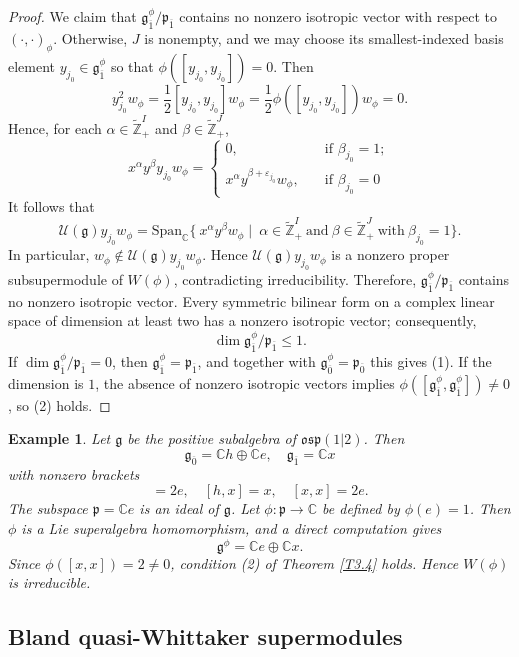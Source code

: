 \documentclass[12pt,reqno]{article}
\newtheorem{ex}{Example}[section]
\def\o{\overline}
\def\a{\alpha}
\def\b{\beta}
\def\F{\mathfrak}
\def\r{\mathrm}
\def\C{\mathcal}
\def\CC{\mathbb{C}}
\def\ZZ{\mathbb{Z}}
\def\beqn{\begin{equation*}}
\def\eeqn{\end{equation*}}
\def\({\left(}
\def\){\right)}
\begin{document}
\begin{proof}
 
We claim that $\F{g}^{\phi}_{\o{1}}/\F{p}_{\o{1}}$ contains no nonzero isotropic vector with respect to $(\cdot,\cdot)_{\phi}$. Otherwise, $J$ is nonempty, and we may choose its smallest-indexed basis element $y_{j_0}\in\F{g}^\phi_{\o{1}}$ so that $\phi([y_{j_0},y_{j_0}])=0$. Then
\beqn
y_{j_0}^2w_{\phi}=\frac{1}{2}[y_{j_0},y_{j_0}]w_\phi=\frac{1}{2}\phi\([y_{j_0},y_{j_0}]\)w_\phi=0.
\eeqn 
Hence, for each $\a\in\widetilde{\ZZ}_+^I$ and $\b\in\widetilde{\ZZ}_+^J$,
 \beqn
 x^\a y^\b y_{j_0}w_{\phi}=\begin{cases}
0,\quad & \text{if $\b_{j_0}=1$};\\
 x^\a y^{\b+\varepsilon_{j_0}} w_{\phi},\quad& \text{if $\b_{j_0}=0$}
\end{cases}
 \eeqn 
  It follows that 
\beqn
\C{U}(\F{g})y_{j_0}w_{\phi}=\r{Span}_\CC\{~x^\a y^\b w_{\phi}\mid~\a\in \widetilde{\ZZ}_+^I~\text{and}~\b\in \widetilde{\ZZ}_+^J~\text{with}~\b_{j_0}= 1\}.
\eeqn
In particular, $w_{\phi}\notin\C{U}(\F{g})y_{j_0}w_{\phi}$. Hence $\C{U}(\F{g})y_{j_0}w_{\phi}$ is a nonzero proper subsupermodule of $W(\phi)$, contradicting irreducibility. Therefore, $\F{g}^{\phi}_{\o{1}}/\F{p}_{\o{1}}$ contains no nonzero isotropic vector. Every symmetric bilinear form on a complex linear space of dimension at least two has a nonzero isotropic vector; consequently,
\beqn
\dim \F{g}^{\phi}_{\o{1}}/\F{p}_{\o{1}}\le 1.
\eeqn
If $\dim\F{g}^{\phi}_{\o{1}}/\F{p}_{\o{1}}=0$, then $\F{g}_{\o{1}}^\phi=\F{p}_{\o{1}}$, and together with $\F{g}_{\o{0}}^\phi=\F{p}_{\o{0}}$ this gives (1). If the dimension is $1$, the absence of nonzero isotropic vectors implies $\phi([\F{g}_{\o{1}}^\phi,\F{g}_{\o{1}}^\phi])\neq0$, so (2) holds.
 \end{proof}
 
\begin{ex}
Let $\F{g}$ be the positive subalgebra of $\F{osp}(1|2)$. Then 
\beqn
\F{g}_{\o{0}}=\CC h\oplus\CC e,\quad \F{g}_{\o{1}}=\CC x
\eeqn
with nonzero brackets
\beqn
[h,e]=2e,\quad [h,x]=x,\quad [x,x]=2e.
\eeqn
The subspace $\F{p}=\CC e$ is an ideal of $\F{g}$. Let $\phi\colon\F{p}\rightarrow\CC$ be defined by $\phi(e)=1$. Then $\phi$ is a Lie superalgebra homomorphism, and a direct computation gives
\beqn
\F{g}^\phi=\CC e\oplus\CC x.
\eeqn	
Since $\phi([x,x])=2\neq0$, condition (2) of Theorem \ref{T3.4} holds. Hence $W(\phi)$ is irreducible.
\end{ex}



\subsection{Bland quasi-Whittaker supermodules}
\end{document}
